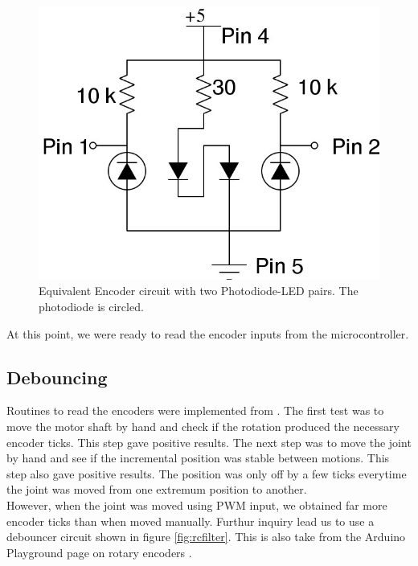 \documentclass[10pt,a4paper]{article}
\begin{document}
\begin{figure}[h]
    \centering
    \includegraphics[scale=0.5]{EncoderCircuit.jpg}
    \caption{Equivalent Encoder circuit with two Photodiode-LED
      pairs. The photodiode is circled.}
    \label{fig:encoderCircuit}
\end{figure}

At this point, we were ready to read the encoder inputs from the
microcontroller. 

\subsection{Debouncing}

Routines to read the encoders were implemented from
\cite{ArduinoPlaygroundRE}.
The first test was to move the motor shaft by hand and check if the
rotation produced the necessary encoder ticks. This step gave positive
results. The next step was to move the joint by hand and see if the
incremental position was stable between motions. This step also gave
positive results. The position was only off by a few ticks everytime
the joint was moved from one extremum position to another. \\

However, when the joint was moved using PWM input, we obtained far
more encoder ticks than when moved manually. Furthur inquiry lead us
to use a debouncer circuit shown in figure \ref{fig:rcfilter}. This is
also take from the Arduino Playground page on rotary encoders
\cite{ArduinoPlaygroundRE}.\\
\end{document}
